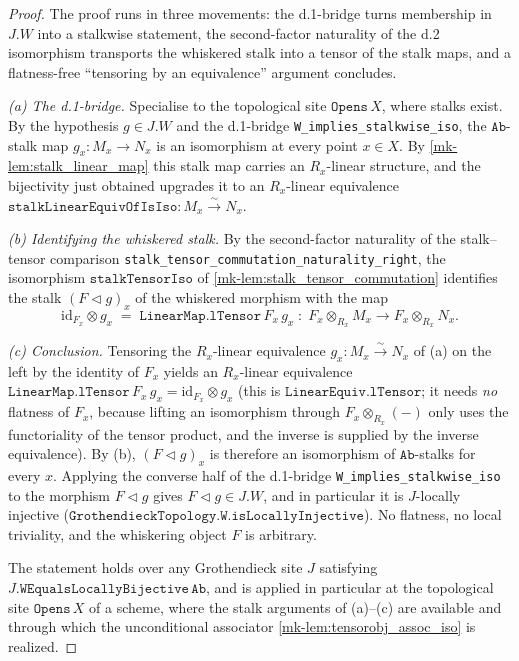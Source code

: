 \begin{proof}
  \leanok
  The proof runs in three movements: the d.1-bridge turns membership in \(J.W\) into a
  stalkwise statement, the second-factor naturality of the d.2 isomorphism transports
  the whiskered stalk into a tensor of the stalk maps, and a flatness-free
  ``tensoring by an equivalence'' argument concludes.

  \emph{(a) The d.1-bridge.} Specialise to the topological site \(\mathtt{Opens}\,X\),
  where stalks exist. By the hypothesis \(g \in J.W\) and the d.1-bridge
  \texttt{W\_implies\_stalkwise\_iso}, the \(\mathtt{Ab}\)-stalk map \(g_x : M_x \to N_x\)
  is an isomorphism at every point \(x \in X\). By \ref{mk-lem:stalk_linear_map} this
  stalk map carries an \(R_x\)-linear structure, and the bijectivity just obtained
  upgrades it to an \(R_x\)-linear equivalence
  \(\mathtt{stalkLinearEquivOfIsIso} : M_x \xrightarrow{\sim} N_x\).

  \emph{(b) Identifying the whiskered stalk.} By the second-factor naturality of the
  stalk--tensor comparison \texttt{stalk\_tensor\_commutation\_naturality\_right}, the
  isomorphism \(\mathtt{stalkTensorIso}\) of \ref{mk-lem:stalk_tensor_commutation}
  identifies the stalk \((F \triangleleft g)_x\) of the whiskered morphism with the
  map
  \[
    \mathrm{id}_{F_x} \otimes g_x \;=\; \mathtt{LinearMap.lTensor}\,F_x\,g_x
      \;\colon\; F_x \otimes_{R_x} M_x \longrightarrow F_x \otimes_{R_x} N_x .
  \]

  \emph{(c) Conclusion.} Tensoring the \(R_x\)-linear equivalence
  \(g_x : M_x \xrightarrow{\sim} N_x\) of (a) on the left by the identity of \(F_x\)
  yields an \(R_x\)-linear equivalence
  \(\mathtt{LinearMap.lTensor}\,F_x\,g_x = \mathrm{id}_{F_x} \otimes g_x\)
  (this is \(\mathtt{LinearEquiv.lTensor}\); it needs \emph{no} flatness of \(F_x\),
  because lifting an isomorphism through \(F_x \otimes_{R_x} (-)\) only uses the
  functoriality of the tensor product, and the inverse is supplied by the inverse
  equivalence). By (b), \((F \triangleleft g)_x\) is therefore an isomorphism of
  \(\mathtt{Ab}\)-stalks for every \(x\). Applying the converse half of the d.1-bridge
  \texttt{W\_implies\_stalkwise\_iso} to the morphism \(F \triangleleft g\) gives
  \(F \triangleleft g \in J.W\), and in particular it is \(J\)-locally injective
  (\(\mathtt{GrothendieckTopology.W.isLocallyInjective}\)). No flatness, no local
  triviality, and the whiskering object \(F\) is arbitrary.

  The statement holds over any Grothendieck site \(J\) satisfying
  \(J.\mathtt{WEqualsLocallyBijective}\,\mathtt{Ab}\), and is applied in particular
  at the topological site \(\mathtt{Opens}\,X\) of a scheme, where the stalk
  arguments of (a)--(c) are available and through which the unconditional associator
  \ref{mk-lem:tensorobj_assoc_iso} is realized.
\end{proof}

